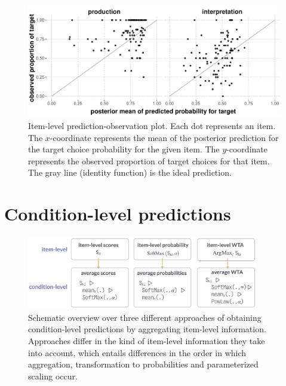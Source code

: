 \documentclass[fleqn]{article}
\begin{document}
\begin{figure}[t]
  \centering

  \includegraphics[width = 0.9\linewidth]{00-pics/GPT-item-combined-obs-pred.pdf}

  \caption{
    Item-level prediction-observation plot.
    Each dot represents an item.
    The $x$-coordinate represents the mean of the posterior prediction for the target choice probability for the given item.
    The $y$-coordinate represents the observed proportion of target choices for that item.
    The gray line (identity function) is the ideal prediction.
  }
  \label{fig:item-level-obs-pred}
\end{figure}


\section{Condition-level predictions}
\label{llm-predictions-for-reference-games}


\begin{figure}
  \centering
  \includegraphics[width=0.9\textwidth]{00-pics/measures-overview.png}
  \caption{
    Schematic overview over three different approaches of obtaining condition-level predictions by aggregating item-level information.
    Approaches differ in the kind of item-level information they take into account, which entails differences in the order in which aggregation, transformation to probabilities and parameterized scaling occur.
  }
  \label{fig:measures-overview}
\end{figure}
\end{document}
